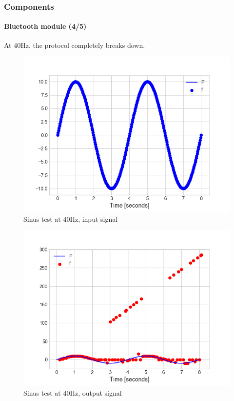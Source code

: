 \documentclass[10pt]{beamer}
\begin{document}

\begin{frame}
\frametitle{Components}
\framesubtitle{Bluetooth module (4/5)}
At 40Hz, the protocol completely breaks down.
\begin{multicols}{2}
\begin{figure}
\centering
\includegraphics[scale=0.4]{figures/sending-40hz.png}
\caption{Sinus test at 40Hz, input signal}
\label{fig:sinus-i-40}
\end{figure}
\columnbreak
\begin{figure}
\centering
\includegraphics[scale=0.4]{figures/reception-40hz.png}
\caption{Sinus test at 40Hz, output signal}
\label{fig:sinus-o-40}
\end{figure}
\end{multicols}
\end{frame}
\end{document}
